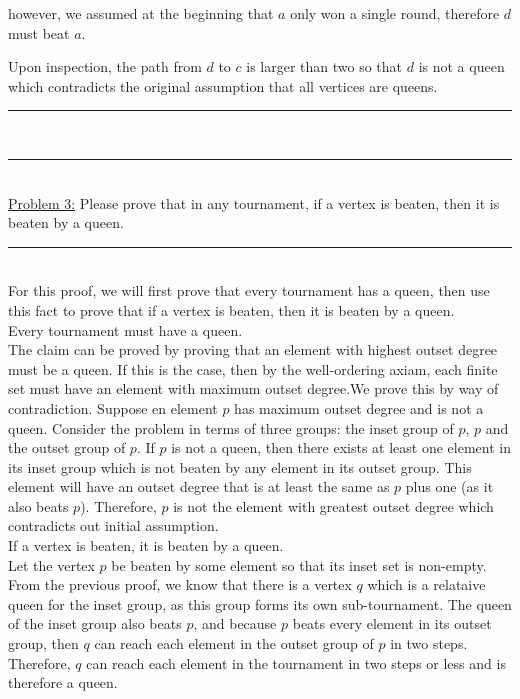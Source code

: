 \documentclass{article}
\newcommand{\problemsep}{\leavevmode\\[0.05in] \rule[\baselineskip/4]{\textwidth}{1pt} \\[0.005in] \rule[\baselineskip]{\textwidth}{1pt}\vspace{-\baselineskip}\leavevmode\\[0.05in]}
\newcommand{\statementsep}{\leavevmode\\[0.005in] \rule[\baselineskip/4]{\textwidth}{0.4pt}\leavevmode\\[0.005in]}
\begin{document}
however, we assumed at the beginning that $a$ only won a single round, therefore $d$ must beat $a$.
\begin{center}
\end{center}
Upon inspection, the path from $d$ to $c$ is larger than two so that $d$ is not a queen which contradicts the original assumption that all vertices are queens.
\problemsep
\noindent\underline{Problem 3:} Please prove that in any tournament, if a vertex is beaten, then it is beaten
by a queen. 
\statementsep
For this proof, we will first prove that every tournament has a queen, then use this fact to prove that if a vertex is beaten, then it is beaten by a queen.\\[0.05in]
 Every tournament must have a queen. \\[0.05in]
 The claim can be proved by proving that an element with highest outset degree must be a queen.  If this is the case, then by the well-ordering axiam, each finite set must have an element with maximum outset degree.We prove this by way of contradiction. Suppose en element $p$ has maximum outset degree and is not a queen. Consider the problem in terms of three groups: the inset group of $p$, $p$ and the outset group of $p$. If $p$ is not a queen, then there exists at least one element in its inset group which is not beaten by any element in its outset group. This element will have an outset degree that is at least the same as $p$ plus one (as it also beats $p$). Therefore, $p$ is not the element with greatest outset degree which contradicts out initial assumption. \\[0.05in]
 If a vertex is beaten, it is beaten by a queen. \\[0.05in]
 Let the vertex $p$ be beaten by some element so that its inset set is non-empty. From the previous proof, we know that there is a vertex $q$ which is a relataive queen for the inset group, as this group forms its own sub-tournament. The queen of the inset group also beats $p$, and because $p$ beats every element in its outset group, then $q$ can reach each element in the outset group of $p$ in two steps.  Therefore, $q$ can reach each element in the tournament in two steps or less and is therefore a queen.
\end{document}
